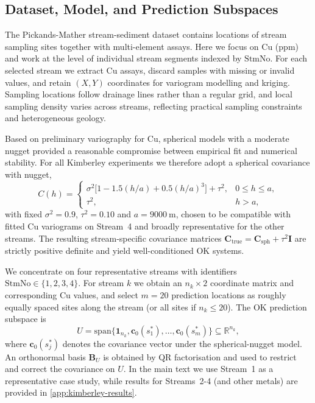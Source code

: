 \documentclass[smallextended]{svjour3}
\newcommand{\1}{\mathbf{1}}
\begin{document}
\subsection{Dataset, Model, and Prediction Subspaces}

The Pickands-Mather stream-sediment dataset contains locations of stream sampling sites together with multi-element assays. Here we focus on Cu (ppm) and work at the level of individual stream segments indexed by $\mathrm{StmNo}$. For each selected stream we extract Cu assays, discard samples with missing or invalid values, and retain $(X,Y)$
coordinates for variogram modelling and kriging. Sampling locations follow drainage lines rather than a regular grid, and local sampling density varies across streams, reflecting practical sampling constraints and heterogeneous geology.

Based on preliminary variography for Cu, spherical models with a moderate nugget provided a reasonable compromise between empirical fit and numerical stability. For all Kimberley experiments we therefore adopt a spherical covariance with nugget,
\[
C(h)
=
\begin{cases}
	\sigma^2 \bigl[1 - 1.5(h/a) + 0.5(h/a)^3\bigr] + \tau^2, & 0 \le h \le a,\\[4pt]
	\tau^2, & h > a,
\end{cases}
\]
with fixed $\sigma^2 = 0.9$, $\tau^2 = 0.10$ and $a = 9000~\mathrm{m}$, chosen to be compatible with fitted Cu variograms on Stream~4 and broadly representative for the other streams. The resulting stream-specific covariance matrices $\mathbf{C}_{\mathrm{true}} = \mathbf{C}_{\mathrm{sph}} + \tau^2 \mathbf{I}$ are strictly positive definite and yield well-conditioned OK systems.

We concentrate on four representative streams with identifiers $\mathrm{StmNo} \in \{1,2,3,4\}$. For stream $k$ we obtain an $n_k \times 2$ coordinate matrix and corresponding Cu values, and select $m = 20$ prediction locations as roughly equally spaced sites along the stream (or all sites if $n_k \le 20$). The OK prediction subspace is
\[
U
=
\mathrm{span}\{\mathbf{1}_{n_k},
\mathbf{c}_0(s_1^\ast),\ldots,\mathbf{c}_0(s_m^\ast)\}
\subseteq \mathbb{R}^{n_k},
\]
where $\mathbf{c}_0(s_j^\ast)$ denotes the covariance vector under the spherical-nugget model. An orthonormal basis $\mathbf{B}_U$ is obtained by QR factorisation and used to restrict and correct the covariance on $U$. In the main text we use Stream~1 as a representative case study, while results for Streams~2-4 (and other metals) are provided in \ref{app:kimberley-results}.
\end{document}
